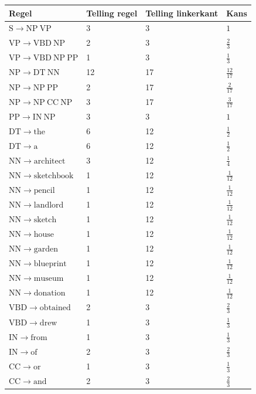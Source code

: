 \documentclass[11pt,a4paper]{article}
\newcommand{\nt}[1]{\ensuremath{\mathrm{#1}}}
\begin{document}
\begin{enumerate}
\begin{center}
\small
\begin{longtable}{llll}
\toprule
Regel & Telling regel & Telling linkerkant & Kans \\
\midrule
\endhead
$\nt{S}\rightarrow \nt{NP}\ \nt{VP}$ & 3 & 3 & $1$ \\
$\nt{VP}\rightarrow \nt{VBD}\ \nt{NP}$ & 2 & 3 & $\frac{2}{3}$ \\
$\nt{VP}\rightarrow \nt{VBD}\ \nt{NP}\ \nt{PP}$ & 1 & 3 & $\frac{1}{3}$ \\
$\nt{NP}\rightarrow \nt{DT}\ \nt{NN}$ & 12 & 17 & $\frac{12}{17}$ \\
$\nt{NP}\rightarrow \nt{NP}\ \nt{PP}$ & 2 & 17 & $\frac{2}{17}$ \\
$\nt{NP}\rightarrow \nt{NP}\ \nt{CC}\ \nt{NP}$ & 3 & 17 & $\frac{3}{17}$ \\
$\nt{PP}\rightarrow \nt{IN}\ \nt{NP}$ & 3 & 3 & $1$ \\
\midrule
$\nt{DT}\rightarrow \text{the}$ & 6 & 12 & $\frac{1}{2}$ \\
$\nt{DT}\rightarrow \text{a}$ & 6 & 12 & $\frac{1}{2}$ \\
$\nt{NN}\rightarrow \text{architect}$ & 3 & 12 & $\frac{1}{4}$ \\
$\nt{NN}\rightarrow \text{sketchbook}$ & 1 & 12 & $\frac{1}{12}$ \\
$\nt{NN}\rightarrow \text{pencil}$ & 1 & 12 & $\frac{1}{12}$ \\
$\nt{NN}\rightarrow \text{landlord}$ & 1 & 12 & $\frac{1}{12}$ \\
$\nt{NN}\rightarrow \text{sketch}$ & 1 & 12 & $\frac{1}{12}$ \\
$\nt{NN}\rightarrow \text{house}$ & 1 & 12 & $\frac{1}{12}$ \\
$\nt{NN}\rightarrow \text{garden}$ & 1 & 12 & $\frac{1}{12}$ \\
$\nt{NN}\rightarrow \text{blueprint}$ & 1 & 12 & $\frac{1}{12}$ \\
$\nt{NN}\rightarrow \text{museum}$ & 1 & 12 & $\frac{1}{12}$ \\
$\nt{NN}\rightarrow \text{donation}$ & 1 & 12 & $\frac{1}{12}$ \\
$\nt{VBD}\rightarrow \text{obtained}$ & 2 & 3 & $\frac{2}{3}$ \\
$\nt{VBD}\rightarrow \text{drew}$ & 1 & 3 & $\frac{1}{3}$ \\
$\nt{IN}\rightarrow \text{from}$ & 1 & 3 & $\frac{1}{3}$ \\
$\nt{IN}\rightarrow \text{of}$ & 2 & 3 & $\frac{2}{3}$ \\
$\nt{CC}\rightarrow \text{or}$ & 1 & 3 & $\frac{1}{3}$ \\
$\nt{CC}\rightarrow \text{and}$ & 2 & 3 & $\frac{2}{3}$ \\
\bottomrule
\end{longtable}
\end{center}


\end{enumerate}
\end{document}
